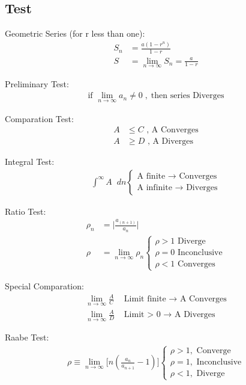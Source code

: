 \documentclass[../main.tex]{subfiles}
\begin{document}
\subsection*{Test}
Geometric Series (for r less than one):
\begin{align*}
    S_n&=\frac{a(1-r^n)}{1-r}\\
    S&=\lim_{n \to \infty} S_n=\frac{a}{1-r}
\end{align*}

Preliminary Test:
\begin{align*}
    \text{if }\lim_{n \to \infty} a_n \neq 0\;,\;\text{then series Diverges}
\end{align*}

Comparation Test:
\begin{align*}
    A&\leq C\text{ , A Converges}\\
    A&\geq D\text{ , A Diverges}
\end{align*}

Integral Test:
\begin{align*}
    \int_{}^{\infty} A\;\;dn
    \begin{cases}
        \text{A finite $\rightarrow$ Converges}\\
        \text{A infinite $\rightarrow$ Diverges}
    \end{cases}
\end{align*}

Ratio Test:
\begin{align*}
    \rho_n&=\bigg \lvert \frac{a_{(n+1)}}{a_n} \bigg \rvert\\
    \rho&=\lim_{n\to \infty} \rho_n
    \begin{cases}
    \rho > 1 \text{ Diverge}\\
    \rho = 0 \text{ Inconclusive}\\
    \rho < 1 \text{ Converges}
    \end{cases}
\end{align*}

Special Comparation:
\begin{align*}
    \lim_{n\to \infty} \frac{A}{C}& \text{ Limit finite $\rightarrow$ A Converges}\\
    \lim_{n\to \infty} \frac{A}{D}& \text{ Limit > 0 $\rightarrow$ A Diverges}
\end{align*}

Raabe Test:
\begin{align*}
    \rho\equiv\lim_{n\to \infty} \bigg[n(\frac{a_n}{a_{n+1}}-1)\bigg]\begin{cases}
        \rho > 1,\textrm{ Converge}\\\rho = 1,\textrm{ Inconclusive}\\\rho < 1,\textrm{ Diverge}
    \end{cases}
\end{align*}
\end{document}
